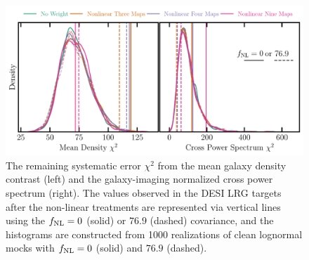 \begin{figure}
    \centering
    \includegraphics[width=\textwidth]{figures/chi2_tests.pdf}
    \caption{The remaining systematic error $\chi^{2}$ from the mean galaxy density contrast (left) and the galaxy-imaging normalized cross power spectrum (right). The values observed in the DESI LRG targets after the non-linear treatments are represented via vertical lines using the $f_{\rm NL}=0$ (solid) or $76.9$ (dashed) covariance, and the histograms are constructed from 1000 realizations of clean lognormal mocks with $f_{\rm NL}=0$ (solid) and $76.9$ (dashed).}\label{fig:chi2test}
\end{figure}

